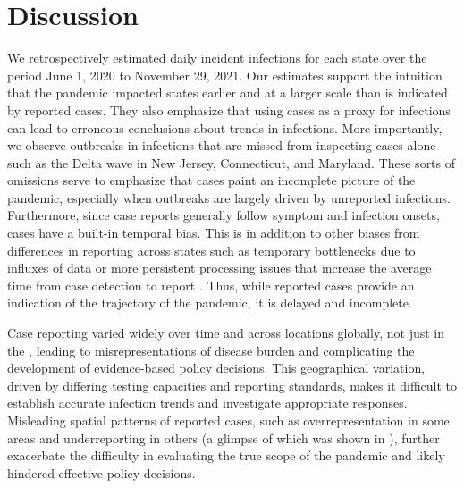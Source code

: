 \section{Discussion}

We retrospectively estimated daily incident infections for each \US state over
the period June 1, 2020 to November 29, 2021. Our estimates support the
intuition that the pandemic impacted states earlier and at a larger scale
than is indicated by reported cases. They also emphasize that using cases as a
proxy for infections can lead to erroneous conclusions about trends in infections.
More importantly, we observe outbreaks in infections that are missed from
inspecting cases alone such as the Delta wave in 
New Jersey, Connecticut, and Maryland.
These sorts of omissions serve to emphasize that cases paint an incomplete
picture of the pandemic, especially when outbreaks are largely driven by
unreported infections. Furthermore, since case reports generally follow symptom
and infection onsets, cases have a built-in temporal bias. This is in addition
to other biases from differences in reporting across states such as temporary
bottlenecks due to influxes of data or more persistent processing issues that
increase the average time from case detection to report \citep{wash2020dash,
dunkel2020covid19}. Thus, while reported cases provide an indication of the
trajectory of the pandemic, it is delayed and incomplete.

Case reporting varied widely over time and across locations globally, not just in 
the 
\US, leading to misrepresentations of disease burden and complicating 
 the development of evidence-based policy decisions. This geographical variation, 
driven 
by differing testing capacities and reporting standards, makes it difficult to establish 
 accurate infection trends and investigate appropriate responses. Misleading spatial 
patterns of reported cases, such as overrepresentation in some areas and 
underreporting in 
others
 (a glimpse of which was shown in ), further 
exacerbate the difficulty in 
 evaluating the true scope of the pandemic and likely hindered effective policy 
decisions.
 
